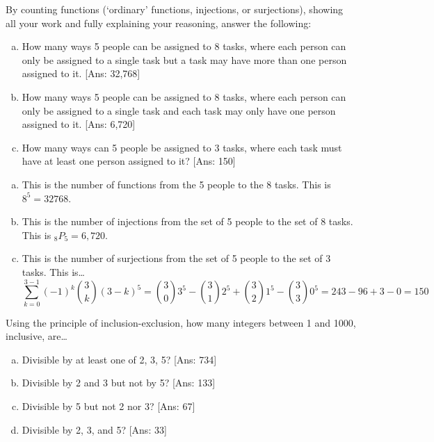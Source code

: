 \documentclass[11pt,letterpaper]{article}
\begin{document}

 By counting functions (`ordinary' functions, injections, or surjections), showing all your work and fully explaining your reasoning, answer the following:
	\begin{enumerate}[(a)]
	\item How many ways 5 people can be assigned to 8 tasks, where each person can only be assigned to a single task but a task may have more than one person assigned to it. [Ans: 32,768]
	\item How many ways 5 people can be assigned to 8 tasks, where each person can only be assigned to a single task and each task may only have one person assigned to it. [Ans: 6,720]
	\item How many ways can 5 people be assigned to 3 tasks, where each task must have at least one person assigned to it? [Ans: 150]
	\end{enumerate} \pspace

\sol 
\begin{enumerate}[(a)]
\item This is the number of functions from the 5 people to the 8 tasks. This is $8^5= 32768$. \pspace

\item This is the number of injections from the set of 5 people to the set of 8 tasks. This is $_{8}P_5= 6,720$. \pspace

\item This is the number of surjections from the set of 5 people to the set of 3 tasks. This is\dots
	\[
	\sum_{k=0}^{3 - 1} (-1)^k \binom{3}{k} (3 - k)^5= \binom{3}{0} 3^5 - \binom{3}{1} 2^5 + \binom{3}{2} 1^5 - \binom{3}{3} 0^5= 243 - 96 + 3 - 0= 150
	\]
\end{enumerate}



\newpage



 Using the principle of inclusion-exclusion, how many integers between 1 and 1000, inclusive, are\dots
	\begin{enumerate}[(a)]
	\item Divisible by at least one of 2, 3, 5? [Ans: 734]
	\item Divisible by 2 and 3 but not by 5? [Ans: 133]
	\item Divisible by 5 but not 2 nor 3? [Ans: 67]
	\item Divisible by 2, 3, and 5? [Ans: 33]
	\end{enumerate} \pspace
\end{document}

